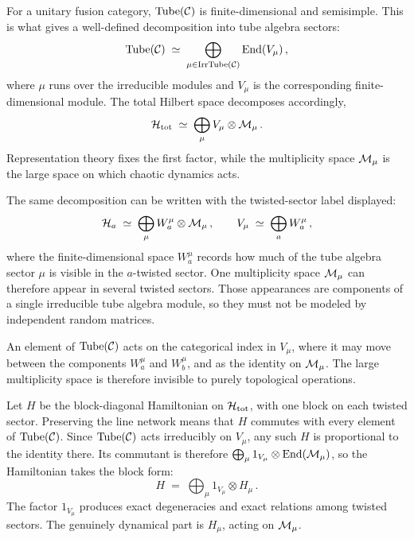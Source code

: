 \documentclass[11pt]{article}
\numberwithin{equation}{section}
\begin{document}
For a unitary fusion category, $\mathrm{Tube}(\mathcal{C})$ is finite-dimensional and semisimple. This is what
gives a well-defined decomposition into tube algebra sectors:
\begin{equation}
  \mathrm{Tube}(\mathcal{C}) \;\simeq\; \bigoplus_{\mu \in \mathrm{Irr} \mathrm{Tube}(\mathcal{C})} \mathrm{End}(V_\mu) \,,
  \label{eq:algdecomp}
\end{equation}
where $\mu$ runs over the irreducible modules and $V_\mu$ is the corresponding
finite-dimensional module. The total Hilbert space decomposes accordingly,
\begin{equation}
  \mathcal{H}_{\rm tot} \;\simeq\; \bigoplus_\mu V_\mu \otimes \mathcal{M}_\mu \,.
  \label{eq:Hdecomp}
\end{equation}
Representation theory fixes the first factor, while the multiplicity space $\mathcal{M}_\mu$ is the
large space on which chaotic dynamics acts.

The same decomposition can be written with the twisted-sector label displayed:
\begin{equation}
  \mathcal{H}_a \;\simeq\; \bigoplus_\mu W^\mu_a \otimes \mathcal{M}_\mu \,,
  \qquad
  V_\mu \;\simeq\; \bigoplus_a W^\mu_a \,,
  \label{eq:Wdecomp}
\end{equation}
where the finite-dimensional space $W^\mu_a$ records how much of the tube algebra sector $\mu$ is
visible in the $a$-twisted sector. One multiplicity space $\mathcal{M}_\mu$ can therefore appear in
several twisted sectors. Those appearances are components of a single irreducible tube algebra
module, so they must not be modeled by independent random matrices.

An element of $\mathrm{Tube}(\mathcal{C})$ acts on the categorical index in $V_\mu$, where it may move between
the components $W^\mu_a$ and $W^\mu_b$, and as the identity on $\mathcal{M}_\mu$. The large
multiplicity space is therefore invisible to purely topological operations.

Let $H$ be the block-diagonal Hamiltonian on $\mathcal{H}_{\rm tot}$, with one block on each twisted sector.
Preserving the line network means that $H$ commutes with every element of $\mathrm{Tube}(\mathcal{C})$. Since
$\mathrm{Tube}(\mathcal{C})$ acts irreducibly on $V_\mu$, any such $H$ is proportional to the identity there.
Its commutant is therefore $\bigoplus_\mu 1_{V_\mu} \otimes \mathrm{End}(\mathcal{M}_\mu)$, so the
Hamiltonian takes the block form:
\begin{equation}
  H \;=\; \bigoplus_\mu 1_{V_\mu} \otimes H_\mu \,.
  \label{eq:Hblocks}
\end{equation}
The factor $1_{V_\mu}$ produces exact degeneracies and exact relations among twisted sectors.
The genuinely dynamical part is $H_\mu$, acting on $\mathcal{M}_\mu$.
\end{document}
